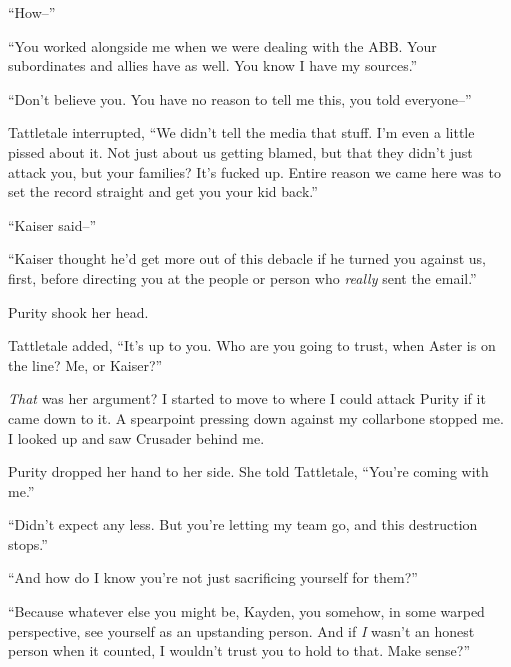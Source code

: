 ``How--''



``You worked alongside me when we were dealing with the ABB.  Your subordinates and allies have as well.  You know I have my sources.''



``Don't believe you.  You have no reason to tell me this, you told everyone--''



Tattletale interrupted, ``We didn't tell the media that stuff.  I'm even a little pissed about it.  Not just about us getting blamed, but that they didn't just attack you, but your families?  It's fucked up.  Entire reason we came here was to set the record straight and get you your kid back.''



``Kaiser said--''



``Kaiser thought he'd get more out of this debacle if he turned you against us, first, before directing you at the people or person who \emph{really} sent the email.''



Purity shook her head.



Tattletale added, ``It's up to you.  Who are you going to trust, when Aster is on the line?  Me, or Kaiser?''



\emph{That} was her argument?  I started to move to where I could attack Purity if it came down to it.  A spearpoint pressing down against my collarbone stopped me.  I looked up and saw Crusader behind me.



Purity dropped her hand to her side.  She told Tattletale, ``You're coming with me.''



``Didn't expect any less.  But you're letting my team go, and this destruction stops.''



``And how do I know you're not just sacrificing yourself for them?''



``Because whatever else you might be, Kayden, you somehow, in some warped perspective, see yourself as an upstanding person.  And if \emph{I }wasn't an honest person when it counted, I wouldn't trust you to hold to that.  Make sense?''



